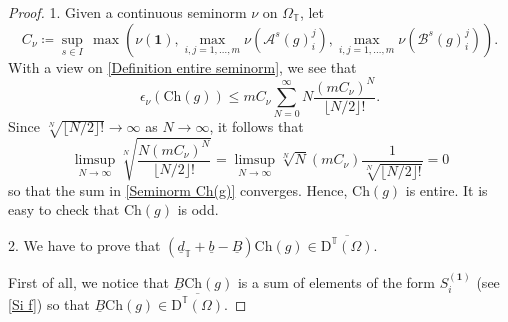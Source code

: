 \documentclass[a4paper, english, 12pt, bibliography=totocnumbered,
index=totoc]{scrartcl}
\begin{document}
\begin{proof}
	1. Given a continuous seminorm $\nu$ on $\Omega_{\mathbb{T}}$, let
	\begin{equation*}
		C_{\nu} \coloneqq \sup_{s \in I} \, \max\left(\nu(\mathbf{1}),
		\max_{i,j =
			1, \ldots, m} \nu(\mathcal{A}^s(g)_{i}^j), \max_{i,j = 1, \ldots,
			m}
		\nu(\mathcal{B}^s(g)_{i}^j)\right).
	\end{equation*}
	With a view on \cref{Definition entire seminorm}, we see that
	\begin{equation}\label{Seminorm Ch(g)}
		\epsilon_{\nu}(\mathrm{Ch}(g)) \leq mC_{\nu}\sum_{N=0}^{\infty} N
		\dfrac{(m C_{\nu})^N}{\lfloor N/2 \rfloor!}.
	\end{equation}
	Since $\sqrt[N]{\lfloor N/2 \rfloor!} \to \infty$ as $N \to \infty$, it
	follows that
	\begin{equation*}
		\limsup_{N \to \infty}\sqrt[N]{\dfrac{N(mC_{\nu})^N}{\lfloor N/2
				\rfloor!}} = \limsup_{N \to \infty} \sqrt[N]{N} (m C_{\nu})
		\dfrac{1}{\sqrt[N]{\lfloor N/2 \rfloor!}} = 0
	\end{equation*}
	so that the sum in \cref{Seminorm Ch(g)} converges.
	Hence, $\mathrm{Ch}(g)$ is entire.
	It is easy to check that $\mathrm{Ch}(g)$ is odd.

	2. We have to prove that $(\underline{d}_{\mathbb{T}} + \underline{b} -
	\underline{B})\mathrm{Ch}(g) \in
	\overline{\mathrm{D}^{\mathbb{T}}(\Omega)}$.

	First of all, we notice that
	$\underline{B}\mathrm{Ch}(g)$ is a sum of elements of the form
	$S_i^{(\mathbf{1})}$ (see \cref{Si f}) so that $\underline{B}
	\mathrm{Ch}(g) \in \overline{\mathrm{D}^{\mathbb{T}}(\Omega)}$.


\end{proof}
\end{document}
